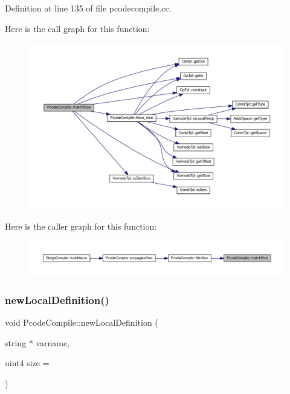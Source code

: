 Definition at line 135 of file pcodecompile.\+cc.

Here is the call graph for this function\+:
\nopagebreak
\begin{figure}[H]
\begin{center}
\leavevmode
\includegraphics[width=350pt]{class_pcode_compile_afe5eba410aa5edfb8ba083cc3f31da2b_cgraph}
\end{center}
\end{figure}
Here is the caller graph for this function\+:
\nopagebreak
\begin{figure}[H]
\begin{center}
\leavevmode
\includegraphics[width=350pt]{class_pcode_compile_afe5eba410aa5edfb8ba083cc3f31da2b_icgraph}
\end{center}
\end{figure}
\mbox{\label{class_pcode_compile_a6c0c8bb263b71750d0772e6c599ed59b}} 
\subsubsection{\texorpdfstring{newLocalDefinition()}{newLocalDefinition()}}
{\footnotesize\ttfamily void Pcode\+Compile\+::new\+Local\+Definition (\begin{DoxyParamCaption}\item[{string $\ast$}]{varname,  }\item[{uint4}]{size = {} }\end{DoxyParamCaption})}



